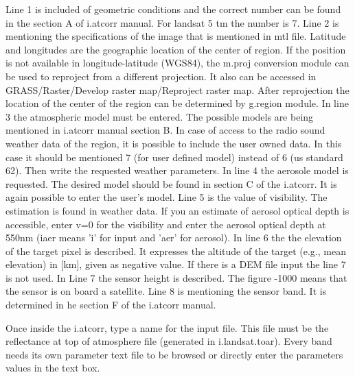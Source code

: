 Line 1 is included of geometric conditions and the correct number can be found in the section A of i.atcorr manual. For landsat 5 tm the number is 7.\newline
Line 2 is mentioning the specifications of the image that is mentioned in mtl file. Latitude and longitudes are the geographic location of the center of region. If the position is not available in longitude-latitude (WGS84), the m.proj conversion module can be used to reproject from a different projection. It also can be accessed in  GRASS/Raster/Develop raster map/Reproject  raster map.\newline
After reprojection the location of the center of the region can be determined by g.region module.\newline
In line 3 the atmospheric model must be entered. The possible models are being mentioned in i.atcorr manual section B. In case of access to the radio sound weather data of the region, it is possible to include the user owned data. In this case it should be mentioned 7 (for user defined model) instead of 6 (us standard 62). Then write the requested weather parameters.\newline
In line 4 the aerosole model is requested. The desired model should be found in section C of the i.atcorr. It is again possible to enter the user's model.\newline
Line 5 is the value of visibility. The estimation is found in weather data. If you an estimate of aerosol optical depth is accessible, enter v=0 for the visibility and enter the aerosol optical depth at 550nm (iaer means 'i' for input and 'aer' for aerosol).\newline
In line 6  the the elevation of the target pixel is described. It expresses the altitude of the target (e.g., mean elevation) in [km], given as negative value. If there is a DEM file input the line 7 is not used.
In Line 7 the sensor height is described. The figure -1000 means that the sensor is on board a satellite.
Line 8 is mentioning the sensor band. It is determined in he section F of the i.atcorr manual.\newline

Once inside the i.atcorr, type a name for the input file. This file must be the reflectance at top of atmosphere file (generated in i.landsat.toar). Every band needs its own parameter text file to be browsed or directly enter the parameters values in the text box.\newline

